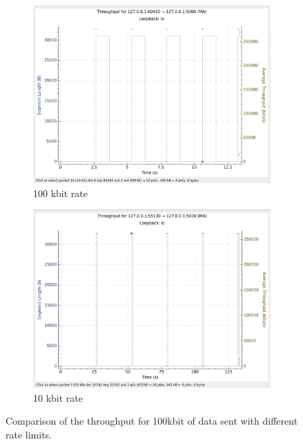 \documentclass{report}
\begin{document}
\begin{figure}[H]
    \begin{subfigure}[b]{0.45\textwidth}
        \centering
        \includegraphics[width=\textwidth]{Pics/Cubic/r100kbit_s100k_th}
        \caption{100 kbit rate}
    \end{subfigure}
    \hfill
    \begin{subfigure}[b]{0.45\textwidth}
        \centering
        \includegraphics[width=\textwidth]{Pics/Cubic/r10kbit_s100kbit_th}
        \caption{10 kbit rate}
    \end{subfigure}
    \caption{Comparison of the throughput for 100kbit of data sent with different rate limits.}
    \label{fig:four_images}
\end{figure}
\end{document}
